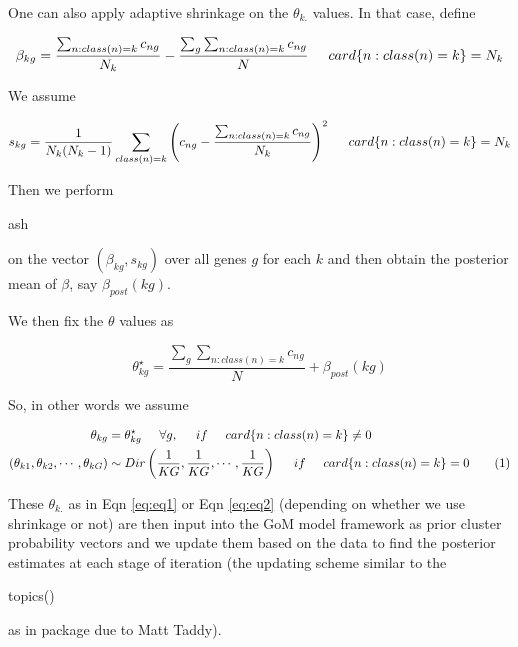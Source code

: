 \documentclass[12pt]{article}\usepackage[]{graphicx}\usepackage[usenames,dvipsnames]{color}
\newcommand\numberthis{\addtocounter{equation}{1}\tag{\theequation}}
\begin{document}
\begin{itemize}
One can also apply adaptive shrinkage on the $\theta_{k.}$ values. In that case, define

\begin{equation}
\beta_{kg} = \frac{\sum_{n:class(n)=k} c_{ng}}{N_{k}} - \frac{\sum_{g} \sum_{n:class(n)=k} c_{ng}}{N} \hspace{0.5 cm}  card \{n: class(n)=k \}=N_{k}
\end{equation}

We assume

\begin{equation}
s_{kg} = \frac{1}{N_{k} (N_{k}-1)} \sum_{class(n)=k} \left (c_{ng} - \frac{\sum_{n:class(n)=k} c_{ng}}{N_{k}} \right )^{2} \hspace{0.5 cm} card \{n: class(n)=k \}=N_{k}
\end{equation}

Then we perform \begin{verb} ash \end{verb} on the vector $(\beta_{kg}, s_{kg})$ over all genes $g$ for each $k$ and then obtain the posterior mean of $\beta$, say $\beta_{post}(kg)$.

We then fix the $\theta$ values as 

\begin{equation}
\theta^{\star}_{kg} = \frac{\sum_{g} \sum_{n:class(n)=k} c_{ng}}{N} + \beta_{post}(kg)
\end{equation}

So, in other words we assume

\begin{align*}
\theta_{kg} & = \theta^{\star}_{kg} \hspace{0.5 cm} \forall g,  \hspace{0.5 cm} if \hspace{0.5 cm} card \{n: class(n)=k \} \neq 0 \nonumber \\
\left(\theta_{k1}, \theta_{k2}, \cdots, \theta_{kG} \right) & \sim Dir \left ( \frac{1}{KG}, \frac{1}{KG}, \cdots, \frac{1}{KG} \right) \hspace{0.5 cm} if \hspace{0.5 cm} card \{n: class(n)=k \}= 0 \numberthis \label{eq:eq2} \\
\end{align*}

These $\theta_{k.}$ as in Eqn \eqref{eq:eq1} or Eqn \eqref{eq:eq2} (depending on whether we use shrinkage or not) are then input into the GoM model framework as prior cluster probability vectors and we update them based on the data to find the posterior estimates at each stage of iteration (the updating scheme similar to the \begin{verb} topics() \end{verb} as in  package due to Matt Taddy).


\end{itemize}
\end{document}
